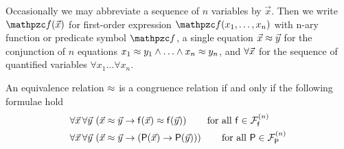 \begin{definition}
	Occasionally we may abbreviate a sequence of $n$ variables by $\vec{x}$.
	Then we write $\mcf(\vecn{x})$ 
	for first-order expression $\mcf(x_1,\ldots,x_n)$
	with n-ary function or predicate symbol $\mcf$,
	a single equation $\vec{x}\approx\vec{y}$ for
	the conjunction of $n$ equations 
	$x_1\approx y_1\land\ldots\land x_n\approx y_n$,
	and $\forall\vec{x}$ for 
	the sequence of quantified variables $\forall x_1\ldots\forall x_n$.
\end{definition}

\begin{definition}
	 An equivalence relation $\approx$ is a congruence relation if and only if
	the following formulae hold 
	\label{def:congruence:schemata}
	\begin{align*}
	\forall\vecn{x}\,\forall\vecn{y}\,
	&\left(\vecn{x}\mEQ\vecn{y} \limp \mf(\vecn{x}) \mEQ \mf(\vecn{y}) \right)
	\tag*{for all $\mf\in\mcFfn$}
	\\
	\forall\vecn{x}\,\forall\vecn{y}\, 
	&\left(\vecn{x}\mEQ\vecn{y} \limp (\mP(\vecn{x}) \limp \mP(\vecn{y}))\right)
	\tag*{for all $\mP\in\mcFPn$}
	\end{align*}
	
	
\end{definition}

